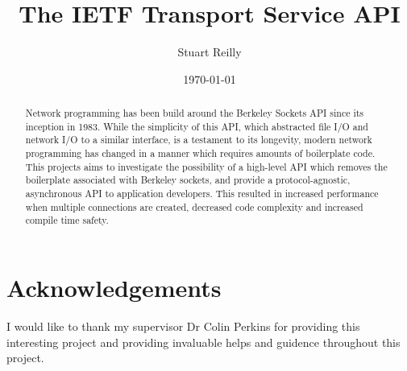 \documentclass{l4proj}
\begin{document}
\title{The IETF Transport Service API}
\author{Stuart Reilly}
\date{\today}
\newcommand{\asyncawait}{\texttt{async/await}}
\newcommand{\preconnection}{\emph{Preconnection}}
\newcommand{\connection}{\emph{Connection}}
\newcommand{\listener}{\emph{Listener}}
\newcommand{\framer}{\emph{Framer}}
\newcommand{\Endpoint}{\emph{Endpoint}}
\newcommand{\encode}{\emph{Encode}}
\newcommand{\decode}{\emph{Decode}}

\maketitle

\begin{abstract}
    Network programming has been build around the Berkeley Sockets API since its inception in 1983.
    While the simplicity of this API, which abstracted file I/O and network I/O to a similar interface,
    is a testament to its longevity, modern network programming has changed in a manner which requires
    amounts of boilerplate code.
    This projects aims to investigate the possibility of a high-level API which removes the boilerplate
    associated with Berkeley sockets, and provide a protocol-agnostic, asynchronous API to application developers.
    This resulted in increased performance when multiple connections are created, decreased code complexity and
    increased compile time safety.
\end{abstract}

\chapter*{Acknowledgements}
I would like to thank my supervisor Dr Colin Perkins for providing this interesting project and providing invaluable
helps and guidence throughout this project.


%
%
\newcommand{\consentname}{Stuart Reilly} %
\newcommand{\consentdate}{\today} %
%
\educationalconsent
\end{document}

